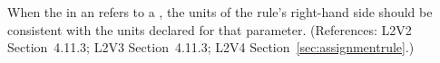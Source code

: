 When the  in an \AssignmentRule refers to a \Parameter, the
units of the rule's right-hand side should be consistent with the units
declared for that parameter.  (References: L2V2 Section~4.11.3;
L2V3 Section~4.11.3; L2V4 Section~\ref{sec:assignmentrule}.)
